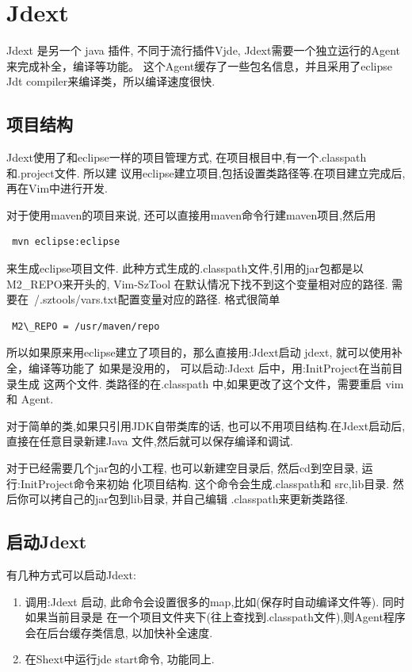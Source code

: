 \documentclass[oneside,openany]{book}
\begin{document}
\section{Jdext}
  Jdext 是另一个 java 插件, 不同于流行插件Vjde, Jdext需要一个独立运行的Agent来完成补全，编译等功能。
这个Agent缓存了一些包名信息，并且采用了eclipse Jdt compiler来编译类，所以编译速度很快. 

\subsection{项目结构}
    Jdext使用了和eclipse一样的项目管理方式, 在项目根目中,有一个.classpath和.project文件. 所以建
议用eclipse建立项目,包括设置类路径等.在项目建立完成后, 再在Vim中进行开发.

   对于使用maven的项目来说, 还可以直接用maven命令行建maven项目,然后用
  \begin{verbatim} mvn eclipse:eclipse \end{verbatim}
  来生成eclipse项目文件. 此种方式生成的.classpath文件,引用的jar包都是以M2\_REPO来开头的, Vim-SzTool
在默认情况下找不到这个变量相对应的路径. 需要在~/.sztools/vars.txt配置变量对应的路径. 格式很简单
  \begin{verbatim} M2\_REPO = /usr/maven/repo \end{verbatim}
所以如果原来用eclipse建立了项目的，那么直接用:Jdext启动 jdext, 就可以使用补全，编译等功能了
如果是没用的， 可以启动:Jdext 后中，用:InitProject在当前目录生成 这两个文件. 类路径的在.classpath 
中,如果更改了这个文件，需要重启 vim和 Agent. 

   对于简单的类,如果只引用JDK自带类库的话, 也可以不用项目结构.在Jdext启动后,直接在任意目录新建Java
文件,然后就可以保存编译和调试.
  
   对于已经需要几个jar包的小工程, 也可以新建空目录后, 然后cd到空目录, 运行:InitProject命令来初始
化项目结构. 这个命令会生成.classpath和 src,lib目录. 然后你可以拷自己的jar包到lib目录, 并自己编辑
.classpath来更新类路径.

\subsection{启动Jdext}
   有几种方式可以启动Jdext:
    \begin{enumerate}
      \item 调用:Jdext 启动, 此命令会设置很多的map,比如(保存时自动编译文件等). 同时如果当前目录是
  在一个项目文件夹下(往上查找到.classpath文件),则Agent程序会在后台缓存类信息, 以加快补全速度.
      \item 在Shext中运行jde start命令, 功能同上.
    \end{enumerate}
\end{document}
